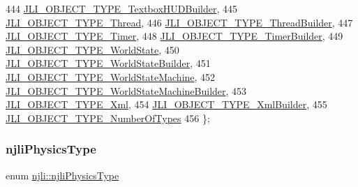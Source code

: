 \begin{DoxyCode}
444     \mbox{\hyperlink{namespacenjli_a6d56d4fbaf89fcf3e3d32839df05b444a0675c3573f15fab7335f67aed34c4e8f}{JLI\_OBJECT\_TYPE\_TextboxHUDBuilder}},
445     \mbox{\hyperlink{namespacenjli_a6d56d4fbaf89fcf3e3d32839df05b444aa7d7f13f89da44fa96bf4664a0dc43a7}{JLI\_OBJECT\_TYPE\_Thread}},
446     \mbox{\hyperlink{namespacenjli_a6d56d4fbaf89fcf3e3d32839df05b444aedd31df53cf0a5a3e8ed438d10902927}{JLI\_OBJECT\_TYPE\_ThreadBuilder}},
447     \mbox{\hyperlink{namespacenjli_a6d56d4fbaf89fcf3e3d32839df05b444ac1dc8091d10d7ba28a1ea747c687f16f}{JLI\_OBJECT\_TYPE\_Timer}},
448     \mbox{\hyperlink{namespacenjli_a6d56d4fbaf89fcf3e3d32839df05b444a06fbb602895b7f1669b0a67aa93218b3}{JLI\_OBJECT\_TYPE\_TimerBuilder}},
449     \mbox{\hyperlink{namespacenjli_a6d56d4fbaf89fcf3e3d32839df05b444adbd175560c2bf0cbbfa4efade7b67150}{JLI\_OBJECT\_TYPE\_WorldState}},
450     \mbox{\hyperlink{namespacenjli_a6d56d4fbaf89fcf3e3d32839df05b444a78136c2e89e2b894b844f5b794fb97a0}{JLI\_OBJECT\_TYPE\_WorldStateBuilder}},
451     \mbox{\hyperlink{namespacenjli_a6d56d4fbaf89fcf3e3d32839df05b444a7d26d655b0e253886193da06295bb3c4}{JLI\_OBJECT\_TYPE\_WorldStateMachine}},
452     \mbox{\hyperlink{namespacenjli_a6d56d4fbaf89fcf3e3d32839df05b444a392ad80c75641027d0d84a646180194b}{JLI\_OBJECT\_TYPE\_WorldStateMachineBuilder}},
453     \mbox{\hyperlink{namespacenjli_a6d56d4fbaf89fcf3e3d32839df05b444a08c8ffe863dd89d0a164a2a2f4d2da59}{JLI\_OBJECT\_TYPE\_Xml}},
454     \mbox{\hyperlink{namespacenjli_a6d56d4fbaf89fcf3e3d32839df05b444a785d967f7b8dd63c33284300e1711ef6}{JLI\_OBJECT\_TYPE\_XmlBuilder}},
455     \mbox{\hyperlink{namespacenjli_a6d56d4fbaf89fcf3e3d32839df05b444a38ea00cb8212b1d00a88582f123b439f}{JLI\_OBJECT\_TYPE\_NumberOfTypes}}
456   \};
\end{DoxyCode}
\mbox{\label{namespacenjli_a60ba626f4609f81870c92d042c6bc83d}} 
\subsubsection{\texorpdfstring{njli\+Physics\+Type}{njliPhysicsType}}
{\footnotesize\ttfamily enum \mbox{\hyperlink{namespacenjli_a60ba626f4609f81870c92d042c6bc83d}{njli\+::njli\+Physics\+Type}}}

